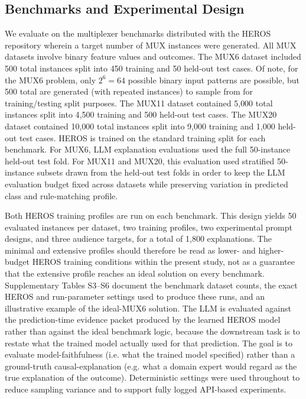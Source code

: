 \documentclass[sigconf]{acmart}
\begin{document}
\subsection{Benchmarks and Experimental Design}
We evaluate on the multiplexer benchmarks distributed with the HEROS repository wherein a target number of MUX instances were generated. All MUX datasets involve binary feature values and outcomes. The MUX6 dataset included 500 total instances split into 450 training and 50 held-out test cases. Of note, for the MUX6 problem, only $2^6=64$ possible binary input patterns are possible, but 500 total are generated (with repeated instances) to sample from for training/testing split purposes. The MUX11 dataset contained 5{,}000 total instances split into 4{,}500 training and 500 held-out test cases. The MUX20 dataset contained 10{,}000 total instances split into 9{,}000 training and 1{,}000 held-out test cases. HEROS is trained on the standard training split for each benchmark. For MUX6, LLM explanation evaluations used the full 50-instance held-out test fold. For MUX11 and MUX20, this evaluation used stratified 50-instance subsets drawn from the held-out test folds in order to keep the LLM evaluation budget fixed across datasets while preserving variation in predicted class and rule-matching profile. 



Both HEROS training profiles are run on each benchmark. This design yields 50 evaluated instances per dataset, two training profiles, two experimental prompt designs, and three audience targets, for a total of 1{,}800 explanations. The minimal and extensive profiles should therefore be read as lower- and higher-budget HEROS training conditions within the present study, not as a guarantee that the extensive profile reaches an ideal solution on every benchmark. Supplementary Tables S3--S6 document the benchmark dataset counts, the exact HEROS and run-parameter settings used to produce these runs, and an illustrative example of the ideal-MUX6 solution. The LLM is evaluated against the prediction-time evidence packet produced by the learned HEROS model rather than against the ideal benchmark logic, because the downstream task is to restate what the trained model actually used for that prediction. The goal is to evaluate model-faithfulness (i.e. what the trained model specified) rather than a ground-truth causal-explanation (e.g. what a domain expert would regard as the true explanation of the outcome). Deterministic settings were used throughout to reduce sampling variance and to support fully logged API-based experiments.
\end{document}
